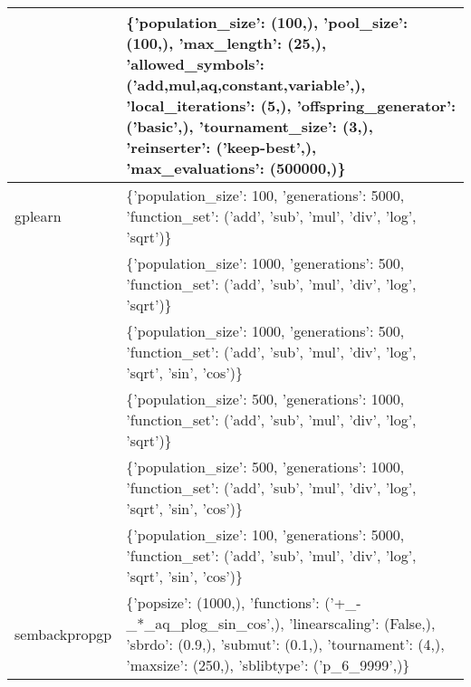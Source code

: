 \begin{tabular}{l p{37em}}
              &                  \{'population\_size': (100,), 'pool\_size': (100,), 'max\_length': (25,), 'allowed\_symbols': ('add,mul,aq,constant,variable',), 'local\_iterations': (5,), 'offspring\_generator': ('basic',), 'tournament\_size': (3,), 'reinserter': ('keep-best',), 'max\_evaluations': (500000,)\} \\
\midrule
      gplearn &                                                                                                                                                                                     \{'population\_size': 100, 'generations': 5000, 'function\_set': ('add', 'sub', 'mul', 'div', 'log', 'sqrt')\} \\
              &                                                                                                                                                                                     \{'population\_size': 1000, 'generations': 500, 'function\_set': ('add', 'sub', 'mul', 'div', 'log', 'sqrt')\} \\
              &                                                                                                                                                                       \{'population\_size': 1000, 'generations': 500, 'function\_set': ('add', 'sub', 'mul', 'div', 'log', 'sqrt', 'sin', 'cos')\} \\
              &                                                                                                                                                                                     \{'population\_size': 500, 'generations': 1000, 'function\_set': ('add', 'sub', 'mul', 'div', 'log', 'sqrt')\} \\
              &                                                                                                                                                                       \{'population\_size': 500, 'generations': 1000, 'function\_set': ('add', 'sub', 'mul', 'div', 'log', 'sqrt', 'sin', 'cos')\} \\
              &                                                                                                                                                                       \{'population\_size': 100, 'generations': 5000, 'function\_set': ('add', 'sub', 'mul', 'div', 'log', 'sqrt', 'sin', 'cos')\} \\
\midrule
sembackpropgp &                                                                                                 \{'popsize': (1000,), 'functions': ('+\_-\_*\_aq\_plog\_sin\_cos',), 'linearscaling': (False,), 'sbrdo': (0.9,), 'submut': (0.1,), 'tournament': (4,), 'maxsize': (250,), 'sblibtype': ('p\_6\_9999',)\} \\

\end{tabular}

